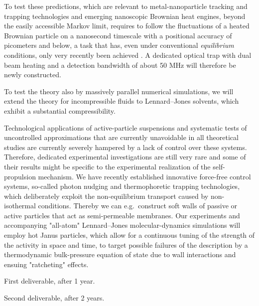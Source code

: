 \begin{workpackage}[id=WPactive,wphases=0-48,
  short=Active Particle Suspensions,%
  title=Probing Active Particle Suspensions with Colloids and Polymers,
  lead=Leipzig,
  LeipzigRM=12]
\begin{tasklist}
\begin{task}[title=Noise Temperature,id=task3,PM=15,lead=Leipzig,wphases=12-42!0.5]
To test these predictions, which are relevant to metal-nanoparticle tracking and trapping technologies and emerging
nanoscopic Brownian heat engines, beyond the easily accessible Markov limit, requires to follow the fluctuations of 
a heated Brownian particle on a nanosecond timescale with a positional accuracy of picometers and below, a task 
that has, even under conventional \emph{equilibrium} conditions, only very recently been achieved \cite{kheifets-etal:2014}.
%
A dedicated optical trap with dual beam heating and a detection bandwidth of about 50 MHz
will therefore be newly constructed.

To test the theory also by massively parallel numerical simulations, we will extend the theory for incompressible fluids 
to Lennard--Jones solvents, which exhibit a substantial compressibility.
\end{task}

\begin{task}[title=Active-Particle Suspensions,id=task4,PM=15,lead=Leipzig,wphases=12-42!0.5]
Technological applications of active-particle suspensions and systematic tests of
uncontrolled approximations that are currently unavoidable in all theoretical studies are
currently severely hampered by a lack of control over these systems.
%
Therefore, dedicated experimental investigations are still very rare and some of their
results might be specific to the experimental realization of the self-propulsion mechanism.
We have recently established innovative force-free control systems, so-called photon nudging
and thermophoretic trapping technologies, which deliberately exploit the non-equilibrium
transport caused by non-isothermal conditions.
%
Thereby we can e.g.\ construct soft walls of passive or active particles that act as
semi-permeable membranes.
%
Our experiments and accompanying "all-atom" Lennard--Jones molecular-dynamics simulations will employ 
hot Janus particles, which allow for a continuous tuning of the strength of the activity in space and time, to target 
possible failures of the description by a thermodynamic bulk-pressure equation of
state \cite{ginot-etal:2015} due to wall interactions and ensuing "ratcheting" effects.
\end{task}


\end{tasklist}

\begin{wpdelivs}
  \begin{wpdeliv}[due=12,id=mydeliv1,dissem=PU,nature=DEM,lead=Leipzig]
      {First deliverable, after 1 year.}
  \end{wpdeliv}
  \begin{wpdeliv}[due=24,id=mydeliv2,dissem=PU,nature=DEM,lead=Leipzig]
      {Second deliverable, after 2 years.}
\end{wpdeliv}
\end{wpdelivs}

\end{workpackage}
